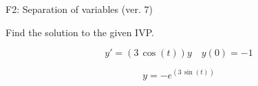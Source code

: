 \begin{exercise}
  \begin{exerciseTitle}F2: Separation of variables (ver. 7)\end{exerciseTitle}
  \begin{exerciseStatement}
    
Find the solution to the given IVP.

    
\[y'=( 3 \, \cos\left(t\right) )y\hspace{1em} y(0)= -1\]

  \end{exerciseStatement}
  \begin{exerciseAnswer}
    
\[y= -e^{\left(3 \, \sin\left(t\right)\right)}\]

  \end{exerciseAnswer}
\end{exercise}